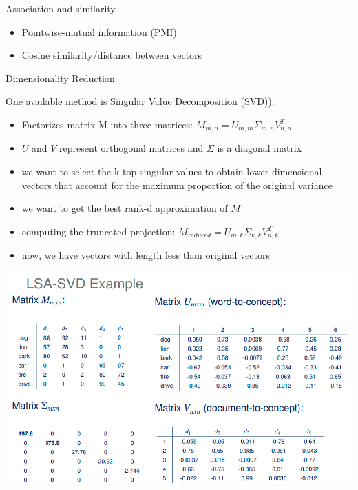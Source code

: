 \documentclass[svgnames]{beamer}
\begin{document}
    \begin{frame}{Association and similarity}
        \begin{itemize}
            \item Pointwise-mutual information (PMI)
            \item Cosine similarity/distance between vectors
        \end{itemize}
    \end{frame}



    \begin{frame}{Dimensionality Reduction}

        One available method is Singular Value Decomposition (SVD)):
        \begin{itemize}
            \item Factorizes matrix M into three matrices: $M_{m,n} = U_{m, m} \Sigma_{m, n} V_{n, n}^T$
            \item $U$ and $V$ represent orthogonal matrices and $\Sigma$ is a diagonal matrix
            \item we want to select the k top singular values to obtain lower
            dimensional vectors that account for the maximum proportion
            of the original variance
            \item we want to get the best rank-d approximation of $M$
            \item computing the truncated projection: $M_{reduced} = U_{m, k} \Sigma_{k, k}V_{n, k}^T$
            \item now, we have vectors with length less than original vectors
        \end{itemize}
    \end{frame}

    \begin{frame}
        \includegraphics[width=.9\textwidth]{lsa-svd1}
    \end{frame}
\end{document}
